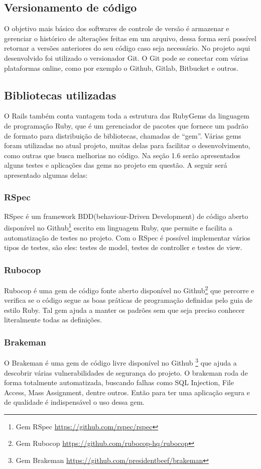 \subsection{Versionamento de código}
O objetivo mais básico dos softwares de controle de versão é armazenar e gerenciar o histórico de alterações feitas em um arquivo, dessa forma será possível retornar a versões anteriores do seu código caso seja necessário. No projeto aqui desenvolvido foi utilizado o versionador Git. O Git pode se conectar com várias plataformas online, como por exemplo o Github, Gitlab, Bitbucket e outros.
\subsection{Bibliotecas utilizadas}
O Rails também conta vantagem toda a estrutura das RubyGems da linguagem de programação Ruby, que é um gerenciador de pacotes que fornece um padrão de formato para distribuição de bibliotecas, chamadas de “gem”. Várias gems foram utilizadas no atual projeto, muitas delas para facilitar o desenvolvimento, como outras que busca melhorias no código. Na seção 1.6 serão apresentados alguns testes e aplicações das gems no projeto em questão. A seguir será apresentado algumas delas:
\subsubsection{RSpec}
RSpec é um framework BDD(behaviour-Driven Development) de código aberto disponível no Github\footnote{Gem RSpec \url{https://github.com/rspec/rspec}} escrito em linguagem Ruby, que permite e facilita a automatização de testes no projeto. Com o RSpec é possível implementar vários tipos de testes, são eles: testes de model, testes de controller e testes de view.
\subsubsection{Rubocop}
Rubocop é uma gem de código fonte aberto disponível no Github\footnote{Gem Rubocop \url{https://github.com/rubocop-hq/rubocop}} que percorre e verifica se o código segue as boas práticas de programação definidas pelo guia de estilo Ruby. Tal gem ajuda a manter os padrões sem que seja preciso conhecer literalmente todas as definições.
\subsubsection{Brakeman}
O Brakeman é uma gem de código livre disponível no Github \footnote{Gem Brakeman \url{https://github.com/presidentbeef/brakeman}} que ajuda a descobrir várias vulnerabilidades de segurança do projeto. O brakeman roda de forma totalmente automatizada, buscando falhas como SQL Injection, File Access, Mass Assignment, dentre outros. Então para ter uma aplicação segura e de qualidade é indispensável o uso dessa gem.

